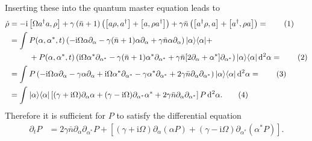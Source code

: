 \documentclass[english, parskip=full]{scrartcl}
\newcommand\numberthis{\addtocounter{equation}{1}\tag{\theequation}}
\newcommand{\intx}{}
\newcommand{\kla}{}
\newcommand{\klam}{}
\newcommand{\oper}{}
\newcommand{\Bra}{}
\newcommand{\Ket}{}
\renewcommand{\i}{\text{i}}
\begin{document}
Inserting these into the quantum master equation leads to
\begin{align*}
\dot{\rho} &= -\i\klam\left[ \Omega a^\dagger a,\rho \right] + \gamma\kla\left( \bar{n}+1 \right)\kla\left( \klam\left[ a\rho,a^\dagger \right] + \klam\left[ a,\rho a^\dagger \right] \right) + \gamma\bar{n} \kla\left( \klam\left[ a^\dagger \rho, a \right] + \klam\left[ a^\dagger, \rho a \right] \right) = \numberthis \\
 &= \intx\int_{ }^{ }  P(\alpha,\alpha^\ast,t)\kla\left(  - \i\Omega \alpha \partial_\alpha - \gamma (\bar{n}+1) \alpha\partial_\alpha +\gamma\bar{n}  \alpha\partial_\alpha   \right) \oper | \alpha \rangle\langle \alpha | + \\
&\hspace{0.9cm} +  P(\alpha,\alpha^\ast,t) \kla\left( \i\Omega\alpha^\ast  \partial_{\alpha^\ast}  - \gamma (\bar{n}+1) \alpha^\ast \partial_{\alpha^\ast}  + \gamma\bar{n}[2\partial_\alpha + \alpha^\ast]  \partial_{\alpha^\ast}  \right)\Ket | \alpha \rangle \Bra\langle \alpha | \, \mathrm{d}^2\alpha =  \numberthis \\
&= \intx\int_{ }^{ }  P\kla\left(  - \i\Omega \alpha \partial_\alpha - \gamma \alpha\partial_\alpha + \i\Omega\alpha^\ast \partial_{\alpha^\ast}   - \gamma \alpha^\ast \partial_{\alpha^\ast}  + 2\gamma\bar{n}\partial_\alpha \partial_{\alpha^\ast}  \right)\Ket | \alpha \rangle \Bra\langle \alpha | \, \mathrm{d}^2\alpha =  \numberthis \\
&= \intx\int_{ }^{ } \oper | \alpha \rangle\langle \alpha | \klam\left[ (\gamma + \i\Omega)\partial_\alpha\alpha + (\gamma - \i\Omega)\partial_{\alpha^\ast}\alpha^\ast + 2\gamma\bar{n}\partial_{\alpha}\partial_{\alpha^\ast} \right]P\, \mathrm{d}^2\alpha. \numberthis
\end{align*}
Therefore it is sufficient for $P$ to satisfy the differential equation
\begin{align}
\partial_tP &= 2\gamma\bar{n} \partial_\alpha  \partial_{\alpha^\ast} P +  \klam\left[ \kla\left( \gamma + \i\Omega \right) \partial_\alpha (\alpha P) + \kla\left( \gamma -  \i\Omega \right) \partial_{\alpha^\ast}(\alpha^\ast P) \right].
\end{align}
\end{document}

